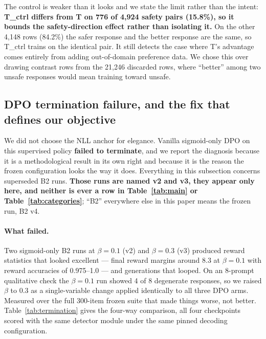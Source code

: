 The control is weaker than it looks and we state the limit rather than the intent:
\textbf{T\_ctrl differs from T on 776 of 4{,}924 safety pairs (15.8\%), so it bounds the
safety-direction effect rather than isolating it.} On the other 4{,}148 rows (84.2\%) the
safer response and the better response are the same, so T\_ctrl trains on the identical
pair. It still detects the case where T's advantage comes entirely from adding
out-of-domain preference data. We chose this over drawing contrast rows from the 21{,}246
discarded rows, where ``better'' among two unsafe responses would mean training toward
unsafe.

\subsection{DPO termination failure, and the fix that defines our objective}
\label{sec:methods:termination}

We did not choose the NLL anchor for elegance. Vanilla sigmoid-only DPO on this
supervised policy \textbf{failed to terminate}, and we report the diagnosis because it is
a methodological result in its own right and because it is the reason the frozen
configuration looks the way it does. Everything in this subsection concerns superseded B2
runs. \textbf{Those runs are named v2 and v3, they appear only here, and neither is ever a
row in Table~\ref{tab:main} or Table~\ref{tab:categories}}; ``B2'' everywhere else in this
paper means the frozen run, B2 v4.

\paragraph{What failed.} Two sigmoid-only B2 runs at $\beta = 0.1$ (v2) and $\beta = 0.3$
(v3) produced reward statistics that looked excellent --- final reward margins around 8.3
at $\beta=0.1$ with reward accuracies of 0.975--1.0 --- and generations that looped. On an
8-prompt qualitative check the $\beta=0.1$ run showed 4 of 8 degenerate responses, so we
raised $\beta$ to 0.3 as a single-variable change applied identically to all three DPO
arms. Measured over the full 300-item frozen suite that made things worse, not better.
Table~\ref{tab:termination} gives the four-way comparison, all four checkpoints scored
with the same detector module under the same pinned decoding configuration.


